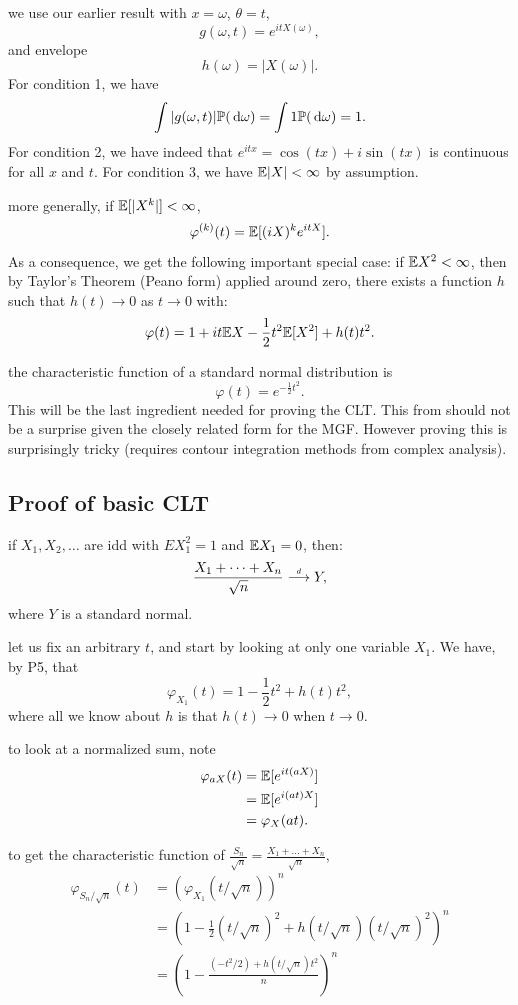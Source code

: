 \documentclass{article}
\begin{document}
 we use our earlier result with $x = \omega$,  $\theta = t$, 
\[ g(\omega, t) = e^{itX(\omega)}, \]
and envelope
\[ h(\omega) = |X(\omega)|. \]
For condition 1, we have
\[ \int | g(\omega, t) | {\mathbb P}(\,\mathrm{d} \omega) = \int 1 {\mathbb P}(\,\mathrm{d} \omega) = 1. \]
For condition 2, we have indeed that $e^{itx} = \cos(tx) + i \sin(tx)$ is continuous for all $x$ and $t$. 
For condition 3, we have ${\mathbb E}|X| < \infty$ by assumption.

 more generally, if ${\mathbb E}[|X^k|] < \infty$, 
\[ \varphi^{(k)}(t) = {\mathbb E}[(iX)^k e^{itX}]. \]
As a consequence, we get the following important special case: if ${\mathbb E} X^2 < \infty$, then by Taylor's Theorem (Peano form) applied around zero, there exists a function $h$ such that $h(t) \to 0$ as $t\to 0$ with:
\[ \varphi(t) = 1 + it{\mathbb E} X - \frac{1}{2} t^2 {\mathbb E}[X^2] + h(t) t^2. \]

 the characteristic function of a standard normal distribution is 
\[ \varphi(t) = e^{-\frac{1}{2} t^2}. \]
This will be the last ingredient needed for proving the CLT. This from should not be a surprise given the closely related form for the MGF. However proving this is surprisingly tricky (requires contour integration methods from complex analysis). 


\subsection{Proof of basic CLT}

 if $X_1, X_2, \dots$ are idd with $E X_1^2 = 1$ and ${\mathbb E} X_1 = 0$, then:
\[ \frac{X_1 + \dots + X_n}{\sqrt{n}} \stackrel{\scriptscriptstyle d}{\longrightarrow} Y, \]
where $Y$ is a standard normal. 

 let us fix an arbitrary $t$, and start by looking at only one variable $X_1$. We have, by P5, that 
\[ \varphi_{X_1}(t) = 1 - \frac{1}{2} t^2 + h(t) t^2, \]
where all we know about $h$ is that $h(t) \to 0$ when $t \to 0$.

 to look at a normalized sum, note
\begin{align*}
\varphi_{aX}(t) &= {\mathbb E}[ e^{it(aX)}] \\
&= {\mathbb E}[ e^{i (at) X} ] \\
&= \varphi_{X}(at).
\end{align*}

 to get the characteristic function of $\frac{S_n}{\sqrt{n}} = \frac{X_1 + \dots + X_n}{\sqrt{n}}$,
\begin{align*}
\varphi_{S_n/\sqrt{n}}(t) &= ( \varphi_{X_1}(t/\sqrt{n}))^n \\
&= \left(1 - \frac{1}{2} (t/\sqrt{n})^2 + h(t/\sqrt{n}) (t/\sqrt{n})^2\right)^n \\
&= \left(1 - \frac{(-t^2/2) + h(t/\sqrt{n}) t^2}{n} \right)^n
\end{align*}
\end{document}

